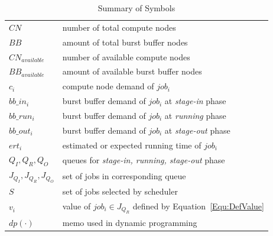 \begin{table}[!htbp] 
        \renewcommand{\arraystretch}{1.3}
        \caption{Summary of Symbols}
        \label{Tab:Symbols}
        \centering
        \begin{tabular}{l|l}
                \hline
                $CN$ & number of total compute nodes \\
                $BB$ & amount of total burst buffer nodes \\
                $CN_{available}$ & number of available compute nodes \\
                $BB_{available}$ & amount of available burst buffer nodes \\
                $c_i$ & compute node demand of $job_i$ \\
                $bb\_in_i$ & burst buffer demand of $job_i$ at \textit{stage-in} phase \\
                $bb\_run_i$ & burst buffer demand of $job_i$ at \textit{running} phase \\
                $bb\_out_i$ & burst buffer demand of $job_i$ at \textit{stage-out} phase \\
                $ert_i$ & estimated or expected running time of $job_i$ \\
                $Q_I, Q_R, Q_O$ & queues for \textit{stage-in, running, stage-out} phase \\
                $J_{Q_I}, J_{Q_R}, J_{Q_O}$ & set of jobs in corresponding queue \\
                $S$ & set of jobs selected by scheduler \\
                $v_i$ & value of $job_i \in J_{Q_R}$ defined by Equation~\ref{Equ:DefValue}\\
                $dp(\cdot)$ & memo used in dynamic programming \\
                \hline
        \end{tabular}
\end{table}

